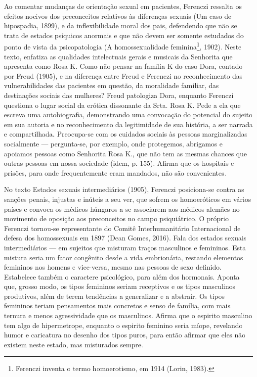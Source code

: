 Ao comentar mudanças de orientação sexual em pacientes, Ferenczi
ressalta os efeitos nocivos dos preconceitos relativos às diferenças
sexuais (Um caso de hipospadia, 1899), e da inflexibilidade moral dos
pais, defendendo que não se trata de estados psíquicos anormais e que
não devem ser somente estudados do ponto de vista da psicopatologia (A
homossexualidade feminina\footnote{Ferenczi inventa o termo
  homoerotismo, em 1914 (Lorin, 1983).}, 1902). Neste texto, enfatiza as
qualidades intelectuais gerais e musicais da Senhorita que apresenta
como Rosa K. Como não pensar na família K do caso Dora, contado por
Freud (1905), e na diferença entre Freud e Ferenczi no reconhecimento
das vulnerabilidades das pacientes em questão, da moralidade familiar,
das destinações sociais das mulheres? Freud patologiza Dora, enquanto
Ferenczi questiona o lugar social da erótica dissonante da Srta. Rosa K.
Pede a ela que escreva uma autobiografia, demonstrando uma convocação do
potencial do sujeito em sua autoria e no reconhecimento da legitimidade
de sua história, a ser narrada e compartilhada. Preocupa-se com os
cuidados sociais às pessoas marginalizadas socialmente --- pergunta-se,
por exemplo, onde protegemos, abrigamos e apoiamos pessoas como
Senhorita Rosa K., que não tem as mesmas chances que outras pessoas em
nossa sociedade (idem, p. 155). Afirma que os hospitais e prisões, para
onde frequentemente eram mandados, não são convenientes.

No texto Estados sexuais intermediários (1905), Ferenczi posiciona-se
contra as sanções penais, injustas e inúteis a seu ver, que sofrem os
homoeróticos em vários países e convoca os médicos húngaros a se
associarem aos médicos alemães no movimento de oposição aos preconceitos
no campo psiquiátrico. O próprio Ferenczi tornou-se representante do
Comitê Interhumanitário Internacional de defesa dos homossexuais em 1897
(Dean Gomes, 2016). Fala dos estados sexuais intermediários --- em
sujeitos que misturam traços masculinos e femininos. Esta mistura seria
um fator congênito desde a vida embrionária, restando elementos
femininos nos homens e vice-versa, mesmo nas pessoas de sexo definido.
Estabelece também o caractere psicológico, para além dos hormonais.
Aponta que, grosso modo, os tipos femininos seriam receptivos e os tipos
masculinos produtivos, além de terem tendências a generalizar e a
abstrair. Os tipos femininos teriam pensamentos mais concretos e senso
de família, com mais ternura e menos agressividade que os masculinos.
Afirma que o espirito masculino tem algo de hipermetrope, enquanto o
espirito feminino seria míope, revelando humor e caricatura no desenho
dos tipos puros, para então afirmar que eles não existem neste estado,
mas misturados sempre.

